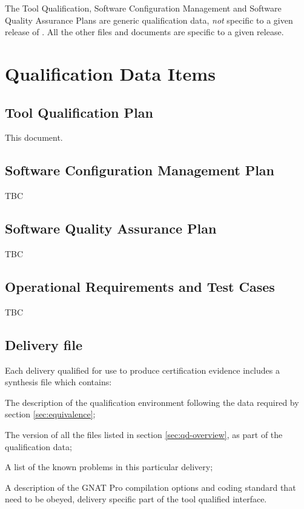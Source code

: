\documentclass {report}
\begin{document}
The Tool Qualification, Software Configuration Management and Software Quality
Assurance Plans are generic qualification data, \emph{not} specific to a given
release of \xcov{}.
%
All the other files and documents are specific to a given \xcov{}
release.

\section{Qualification Data Items}

\subsection{Tool Qualification Plan}

This document.

\subsection{Software Configuration Management Plan}

TBC

\subsection{Software Quality Assurance Plan}

TBC

\subsection{Operational Requirements and Test Cases}

TBC

\subsection{Delivery file}
\label{sec:delivery}

Each delivery qualified for use to produce certification evidence includes a
 synthesis file which contains:

\begin{Itemize} 
\item%
  The description of the qualification environment following the data
  required by section \ref{sec:equivalence};
\item%
  The version of all the files listed in section \ref{sec:qd-overview}, as
  part of the qualification data;
\item%
  A list of the known problems in this particular delivery;
\item%
  A description of the GNAT Pro compilation options and coding standard that
  need to be obeyed, delivery specific part of the tool qualified interface.
\end{Itemize}
\end{document}
